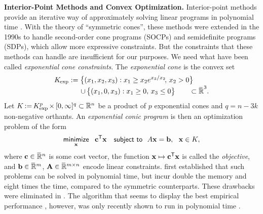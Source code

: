 \textbf{Interior-Point Methods and Convex Optimization.}
Interior-point methods provide an iterative way of approximately solving linear programs in polynomial time \parencite{karmarkar1984new}.
With the theory of ``symmetric cones'', these methods were extended in the 1990s to handle second-order cone programs (SOCPs) and semidefinite programs (SDPs), which allow more expressive constraints.
But the constraints that these methods can handle are insufficient for
our purposes. We need what have been called \emph{exponential cone constraints}.
The \emph{exponential cone} is the convex set
\begin{align*}
        \begin{aligned}
        K_{\mskip-1mu\exp} :=
        \big\{ (x_1, x_2, x_3) &:
                x_1 \ge x_2 e^{x_3 / x_2}\!,\, x_2 > 0 \big\}
            \\[-0.6ex]\quad \mathbin{\cup}\,
        \big\{ (x_1, 0, x_3&) : x_1 \ge 0,\, x_3 \le 0 \big\}
        \qquad \subset \mathbb {\mskip1mu\overline{\mskip-1mu\mathbb R\!}\,}^3.
    \end{aligned}
\end{align*}
Let $K \mskip-2mu := \mskip-2mu K_{\exp}^p \mskip-2mu \times \mskip-1mu
[0, \infty]^q 
\subset \smash{\mskip1mu\overline{\mskip-1mu\mathbb R\!}\,}^n$ be a product of $p$ exponential cones and $q = n - 3k$ non-negative orthants.
An \emph{exponential conic program} is then an optimization problem of the form
\begin{equation}
    \minimize
        _{\mat x}
        ~~ \mat c^{\sf T} \mat x
    \quad\subjto
    ~~ A \mat x = \mat b,~~\mat x \in 
        K,
        \label{eq:exp-conic-program}
\end{equation}
where $\mathbf c \in \mskip1mu\overline{\mskip-1mu\mathbb R\!}\,^{n}$ is some cost vector,
the function $\mathbf x \mapsto \mathbf c^{\sf T} \mathbf x$ is called the \emph{objective},
and $\mathbf b \in \mskip1mu\overline{\mskip-1mu\mathbb R\!}\,^m$, $\mathbf A \in \mskip1mu\overline{\mskip-1mu\mathbb R\!}\,^{m \times n}$ encode linear constraints.
\textcite*{nesterov1996infeasible} first established that such problems can be solved in polynomial time, but incur double the memory and eight times the time, compared to the symmetric counterparts. These drawbacks were eliminated in \cite{skajaa2015homogeneous}.
The algorithm that seems to display the best empirical performance \parencite{dahl2022primal}, however, was only recently shown to
run in polynomial time \parencite{badenbroek2021algorithm}.

